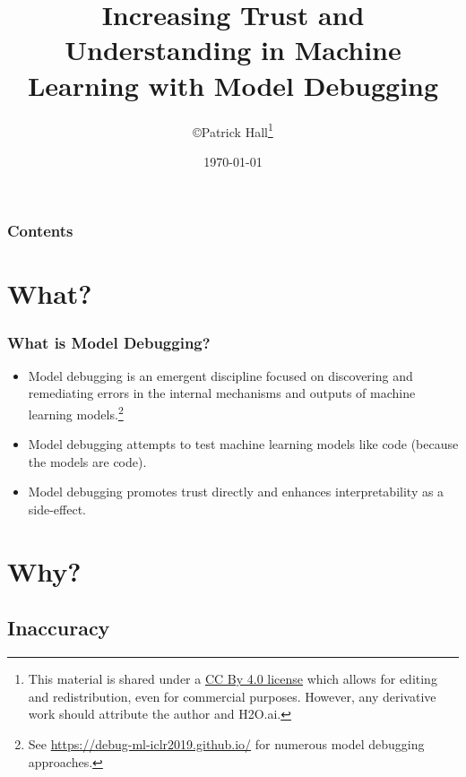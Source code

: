 \documentclass[11pt,
               aspectratio=43,
               hyperref={colorlinks}
               ]{beamer}
\author{\copyright\hspace{1pt}Patrick Hall\footnote{\tiny{This material is shared under a \href{https://creativecommons.org/licenses/by/4.0/deed.ast}{CC By 4.0 license} which allows for editing and redistribution, even for commercial purposes. However, any derivative work should attribute the author and H2O.ai.}}}
\title{Increasing Trust and Understanding in Machine Learning with Model Debugging }
\institute{\href{https://www.h2o.ai}{H\textsubscript{2}O.ai}}
\date{\today}
\begin{document}
	
	\maketitle
	
	\begin{frame}
	
		\frametitle{Contents}
		
		\tableofcontents{}
		
	\end{frame}

	\section{What?}

	\begin{frame}
		
		\frametitle{What is Model Debugging?}
		
		\begin{itemize}
			\item Model debugging is an emergent discipline focused on discovering and remediating errors in the internal mechanisms and outputs of machine learning models.\footnote{See \url{https://debug-ml-iclr2019.github.io/} for numerous model debugging approaches.} 
			\item Model debugging attempts to test machine learning models like code (because the models are code).
			\item Model debugging promotes trust directly and enhances interpretability as a side-effect.
		\end{itemize}
		
	\end{frame}

	\section{Why?}

		\subsection{Inaccuracy}
\end{document}
